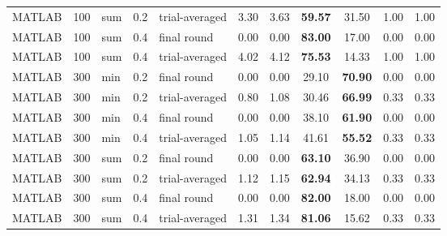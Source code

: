 {\begin{tabular}{lllll|cccccc}
MATLAB & 100 & sum & 0.2 & trial-averaged & 3.30 & 3.63 & {\cellcolor[HTML]{C8E6C9}} \bfseries 59.57 & 31.50 & 1.00 & 1.00 \\
MATLAB & 100 & sum & 0.4 & final round & 0.00 & 0.00 & {\cellcolor[HTML]{C8E6C9}} \bfseries 83.00 & 17.00 & 0.00 & 0.00 \\
MATLAB & 100 & sum & 0.4 & trial-averaged & 4.02 & 4.12 & {\cellcolor[HTML]{C8E6C9}} \bfseries 75.53 & 14.33 & 1.00 & 1.00 \\
MATLAB & 300 & min & 0.2 & final round & 0.00 & 0.00 & {\cellcolor[HTML]{C8E6C9}} 29.10 & \bfseries 70.90 & 0.00 & 0.00 \\
MATLAB & 300 & min & 0.2 & trial-averaged & 0.80 & 1.08 & {\cellcolor[HTML]{C8E6C9}} 30.46 & \bfseries 66.99 & 0.33 & 0.33 \\
MATLAB & 300 & min & 0.4 & final round & 0.00 & 0.00 & {\cellcolor[HTML]{C8E6C9}} 38.10 & \bfseries 61.90 & 0.00 & 0.00 \\
MATLAB & 300 & min & 0.4 & trial-averaged & 1.05 & 1.14 & {\cellcolor[HTML]{C8E6C9}} 41.61 & \bfseries 55.52 & 0.33 & 0.33 \\
MATLAB & 300 & sum & 0.2 & final round & 0.00 & 0.00 & {\cellcolor[HTML]{C8E6C9}} \bfseries 63.10 & 36.90 & 0.00 & 0.00 \\
MATLAB & 300 & sum & 0.2 & trial-averaged & 1.12 & 1.15 & {\cellcolor[HTML]{C8E6C9}} \bfseries 62.94 & 34.13 & 0.33 & 0.33 \\
MATLAB & 300 & sum & 0.4 & final round & 0.00 & 0.00 & {\cellcolor[HTML]{C8E6C9}} \bfseries 82.00 & 18.00 & 0.00 & 0.00 \\
MATLAB & 300 & sum & 0.4 & trial-averaged & 1.31 & 1.34 & {\cellcolor[HTML]{C8E6C9}} \bfseries 81.06 & 15.62 & 0.33 & 0.33 \\
\bottomrule
\end{tabular}
}%
